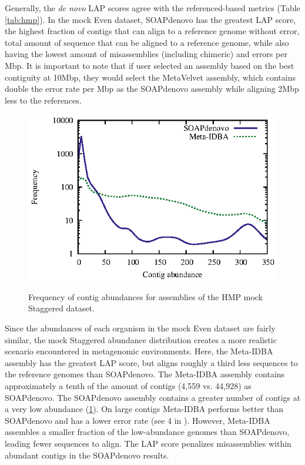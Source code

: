 Generally, the \emph{de novo} LAP scores agree with the referenced-based metrics (Table \ref{tab:hmp}).
In the mock Even dataset, SOAPdenovo has the greatest LAP score, the highest fraction of contigs that can align to a reference genome without error, total amount of sequence that can be aligned to a reference genome, while also having the lowest amount of misassemblies (including chimeric) and errors per Mbp.
It is important to note that if user selected an assembly based on the best contiguity at 10Mbp, they would select the MetaVelvet assembly, which contains double the error rate per Mbp as the SOAPdenovo assembly while aligning 2Mbp less to the references.

\begin{figure}[tb!]
\begin{center}
\includegraphics[width=.8\textwidth]{coverage}
\end{center}
\renewcommand{\baselinestretch}{1}
\small\normalsize
\begin{quote}
\caption[Frequency of contig abundances for assemblies of the HMP mock Staggered dataset]{Frequency of contig abundances for assemblies of the HMP mock Staggered dataset.}
\label{fig:coverage}
\end{quote}
\end{figure}
\renewcommand{\baselinestretch}{2}
\small\normalsize

Since the abundances of each organism in the mock Even dataset are fairly similar, the mock Staggered abundance distribution creates a more realistic scenario encountered in metagenomic environments.
Here, the Meta-IDBA assembly has the greatest LAP score, but aligns roughly a third less sequences to the reference genomes than SOAPdenovo.
The Meta-IDBA assembly contains approximately a tenth of the amount of contigs (4,559 vs. 44,928) as SOAPdenovo.
The SOAPdenovo assembly contains a greater number of contigs at a very low abundance (\figurename \ref{fig:coverage}).
On large contigs Meta-IDBA performs better than SOAPdenovo and has a lower error rate (see \figurename 4 in \cite{treangen2013metamos}).
However, Meta-IDBA assembles a smaller fraction of the low-abundance genomes than SOAPdenovo, leading fewer sequences to align.
The LAP score penalizes misassemblies within abundant contigs in the SOAPdenovo results.


